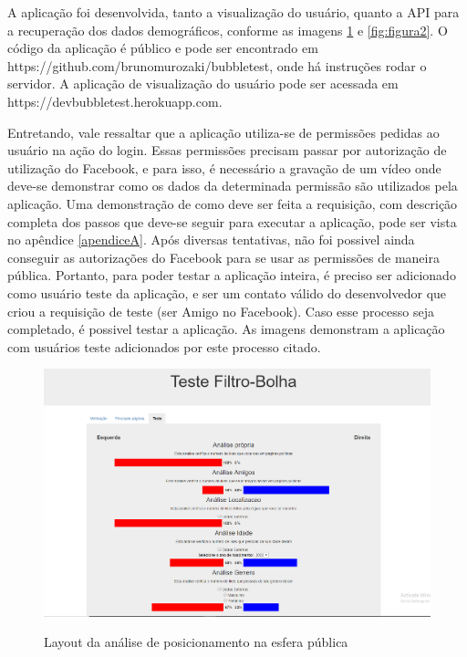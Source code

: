 \documentclass[
	12pt,				%
	oneside,			%
	a4paper,			%
	english,			%
	brazil				%
	]{abntex2ppgsi}
\begin{document}
A aplicação foi desenvolvida, tanto a visualização do usuário, quanto a API para a recuperação dos dados demográficos, conforme as imagens \ref{fig:figura1} e \ref{fig:figura2}. O código da aplicação é público e pode ser encontrado em https://github.com/brunomurozaki/bubbletest, onde há instruções rodar o servidor. A aplicação de visualização do usuário pode ser acessada em https://devbubbletest.herokuapp.com.

Entretando, vale ressaltar que a aplicação utiliza-se de permissões pedidas ao usuário na ação do login. Essas permissões precisam passar por autorização de utilização do Facebook, e para isso, é necessário a gravação de um vídeo onde deve-se demonstrar como os dados da determinada permissão são utilizados pela aplicação. Uma demonstração de como deve ser feita a requisição, com descrição completa dos passos que deve-se seguir para executar a aplicação, pode ser vista no apêndice \ref{apendiceA}. Após diversas tentativas, não foi possivel ainda conseguir as autorizações do Facebook para se usar as permissões de maneira pública. Portanto, para poder testar a aplicação inteira, é preciso ser adicionado como usuário teste da aplicação, e ser um contato válido do desenvolvedor que criou a requisição de teste (ser Amigo no Facebook). Caso esse processo seja completado, é possivel testar a aplicação. As imagens demonstram a aplicação com usuários teste adicionados por este processo citado.

\begin{figure}[H]
	\centering
	\caption{Layout da análise de posicionamento na esfera pública}
	\includegraphics[scale=0.4]{figura1.png}
	\label{fig:figura1}
\end{figure}
\end{document}

